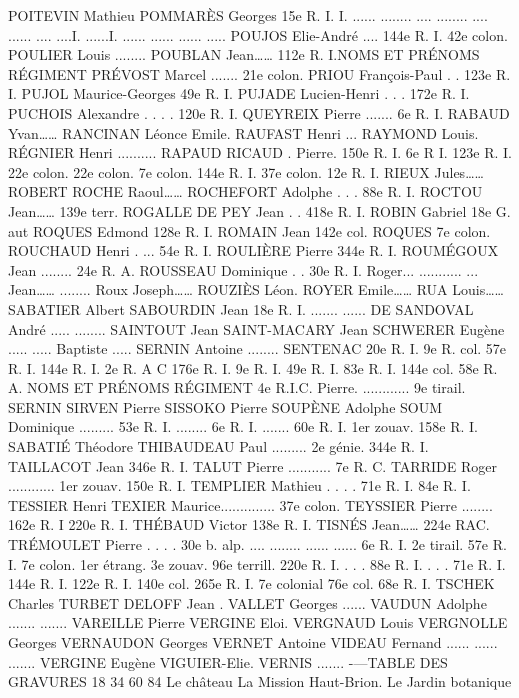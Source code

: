 \documentclass[a4paper,11pt]{book}
\begin{document}
POITEVIN Mathieu
POMMARÈS Georges
15e R. I.
I.
......
........
....
........
....
......
....
....I.
......I.
......
......
......
.....
POUJOS Elie-André .... 144e R. I.
42e colon.
POULIER Louis ........
POUBLAN Jean……
112e R. I.NOMS ET PRÉNOMS
RÉGIMENT
PRÉVOST Marcel ....... 21e colon.
PRIOU François-Paul . . 123e R. I.
PUJOL Maurice-Georges 49e R. I.
PUJADE Lucien-Henri . . . 172e R. I.
PUCHOIS Alexandre . . . . 120e R. I.
QUEYREIX Pierre
....... 6e R. I.
RABAUD Yvan……
RANCINAN
Léonce
Emile.
RAUFAST Henri
...
RAYMOND Louis.
RÉGNIER Henri ..........
RAPAUD
RICAUD
.
Pierre.
150e R. I.
6e R I.
123e R. I.
22e colon.
22e colon.
7e colon.
144e R. I.
37e colon.
12e R. I.
RIEUX Jules……
ROBERT
ROCHE Raoul……
ROCHEFORT Adolphe . . . 88e R. I.
ROCTOU Jean……
139e terr.
ROGALLE DE PEY Jean . . 418e R. I.
ROBIN Gabriel
18e G. aut
ROQUES Edmond
128e R. I.
ROMAIN Jean
142e col.
ROQUES
7e colon.
ROUCHAUD Henri . ...
54e R. I.
ROULIÈRE Pierre
344e R. I.
ROUMÉGOUX Jean ........ 24e R. A.
ROUSSEAU Dominique . . 30e R. I.
Roger...
...........
...
Jean……
........
Roux Joseph……
ROUZIÈS Léon.
ROYER Emile……
RUA Louis……
SABATIER Albert
SABOURDIN Jean
18e R. I.
.......
......
DE SANDOVAL André
.....
........
SAINTOUT Jean
SAINT-MACARY Jean
SCHWERER Eugène
.....
.....
Baptiste .....
SERNIN Antoine ........
SENTENAC
20e R. I.
9e R. col.
57e R. I.
144e R. I.
2e R. A C
176e R. I.
9e R. I.
49e R. I.
83e R. I.
144e col.
58e R. A.
NOMS ET PRÉNOMS
RÉGIMENT
4e R.I.C.
Pierre.
............ 9e tirail.
SERNIN
SIRVEN Pierre
SISSOKO Pierre
SOUPÈNE Adolphe
SOUM Dominique
......... 53e R. I.
........ 6e R. I.
....... 60e R. I.
1er zouav.
158e R. I.
SABATIÉ Théodore
THIBAUDEAU Paul ......... 2e génie.
344e R. I.
TAILLACOT Jean
346e R. I.
TALUT Pierre ...........
7e R. C.
TARRIDE Roger ............ 1er zouav.
150e R. I.
TEMPLIER Mathieu . . . . 71e R. I.
84e R. I.
TESSIER Henri
TEXIER Maurice.............. 37e colon.
TEYSSIER Pierre ........ 162e R. I
220e R. I.
THÉBAUD Victor
138e R. I.
TISNÉS Jean……
224e RAC.
TRÉMOULET Pierre . . . . 30e b. alp.
....
........
......
......
6e R. I.
2e tirail.
57e R. I.
7e colon.
1er étrang.
3e zouav.
96e terrill.
220e R. I.
. . . 88e R. I.
. . . 71e R. I.
144e R. I.
122e R. I.
140e col.
265e R. I.
7e colonial
76e col.
68e R. I.
TSCHEK Charles
TURBET DELOFF Jean
.
VALLET Georges
......
VAUDUN Adolphe .......
.......
VAREILLE Pierre
VERGINE Eloi.
VERGNAUD Louis
VERGNOLLE Georges
VERNAUDON Georges
VERNET Antoine
VIDEAU Fernand
......
......
.......
VERGINE Eugène
VIGUIER-Elie.
VERNIS
.......
-—TABLE DES GRAVURES
18
34
60
84
Le château La Mission Haut-Brion.
Le Jardin botanique
\end{document}

